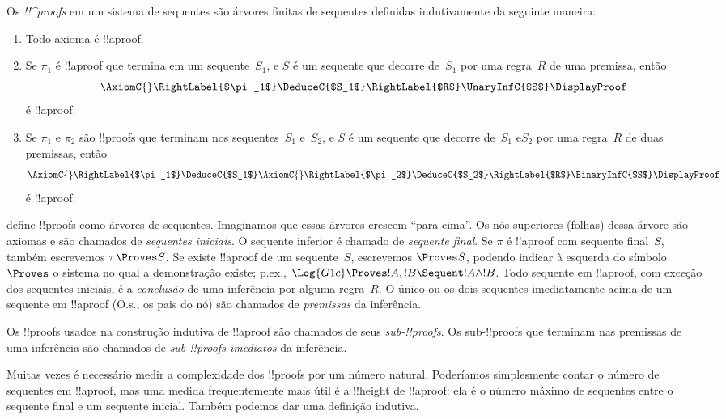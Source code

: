\documentclass[../../../include/open-logic-section]{subfiles}
\begin{document}
\begin{defn}
Os \emph{!!^{proof}s} em um sistema de sequentes são árvores finitas de
sequentes definidas indutivamente da seguinte maneira:
\begin{enumerate}
  \item{} Todo axioma é !!a{proof}.
  \item{} Se $\pi_1$ é !!a{proof} que termina em
  um sequente~$S_1$, e $S$ é um sequente que decorre de~$S_1$ por uma
  regra~$R$ de uma premissa, então
  \[
  \AxiomC{}
  \RightLabel{$\pi_1$}
  \DeduceC{$S_1$}
  \RightLabel{$R$}
  \UnaryInfC{$S$}
  \DisplayProof
  \]
  é !!a{proof}.
  \item{} Se $\pi_1$ e $\pi_2$ são !!{proof}s que terminam nos sequentes~$S_1$ e~$S_2$, e $S$ é um
  sequente que decorre de~$S_1$ e$S_2$ por uma regra~$R$ de duas premissas, então
  \[
  \AxiomC{}
  \RightLabel{$\pi_1$}
  \DeduceC{$S_1$}
  \AxiomC{}
  \RightLabel{$\pi_2$}
  \DeduceC{$S_2$}
  \RightLabel{$R$}
  \BinaryInfC{$S$}
  \DisplayProof
  \]
  é !!a{proof}.
\end{enumerate}
\end{defn}

 define !!{proof}s como árvores de sequentes. Imaginamos
que essas árvores crescem ``para cima''. Os nós superiores (folhas) dessa
árvore são axiomas e são chamados de \emph{sequentes iniciais}. O sequente
inferior é chamado de \emph{sequente final}. Se $\pi$ é !!a{proof} com
sequente final~$S$, também escrevemos $\pi \Proves S$. Se existe
!!a{proof} de um sequente~$S$, escrevemos $\Proves S$, podendo indicar à
esquerda do símbolo~$\Proves$ o sistema no qual a demonstração existe; p.ex., $\Log{G1c} \Proves !A, !B \Sequent !A \land !B$. Todo sequente em
!!a{proof}, com exceção dos sequentes iniciais, é a \emph{conclusão} de uma
inferência por alguma regra~$R$. O único ou os dois sequentes imediatamente
acima de um sequente em !!a{proof} (O.s.\@, os pais do nó) são chamados de
\emph{premissas} da inferência.

Os !!{proof}s usados na construção indutiva de !!a{proof} são chamados de
seus \emph{sub-!!{proof}s}. Os sub-!!{proof}s que terminam nas premissas de
uma inferência são chamados de \emph{sub-!!{proof}s imediatos} da
inferência.

Muitas vezes é necessário medir a complexidade dos !!{proof}s por um número
natural. Poderíamos simplesmente contar o número de sequentes em !!a{proof},
mas uma medida frequentemente mais útil é a !!{height} de !!a{proof}: ela é
o número máximo de sequentes entre o sequente final e um sequente inicial.
Também podemos dar uma definição indutiva.
\end{document}
